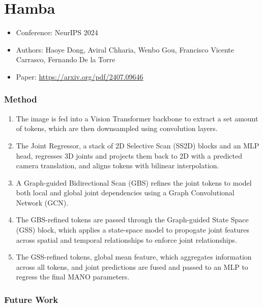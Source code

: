 \documentclass{article}
\begin{document}
\pagebreak

\section*{Hamba}

\begin{itemize}
    \item Conference: NeurIPS 2024
    \item Authors: Haoye Dong, Aviral Chharia, Wenbo Gou, Francisco Vicente Carrasco, Fernando De la Torre
    \item Paper: \url{https://arxiv.org/pdf/2407.09646}
\end{itemize}

\subsubsection*{Method}
\begin{enumerate}
    \item The image is fed into a Vision Transformer backbone to extract a set amount of tokens, which are then downsampled using convolution layers.
    \item The Joint Regressor, a stack of 2D Selective Scan (SS2D) blocks and an MLP head, regresses 3D joints and projects them back to 2D with a predicted camera translation, and aligns tokens with bilinear interpolation.
    \item A Graph-guided Bidirectional Scan (GBS) refines the joint tokens to model both local and global joint dependencies using a Graph Convolutional Network (GCN).
    \item The GBS-refined tokens are passed through the Graph-guided State Space (GSS) block, which applies a state-space model to propogate joint features across spatial and temporal relationships to enforce joint relationships.
    \item The GSS-refined tokens, global mean feature, which aggregates information across all tokens, and joint predictions are fused and passed to an MLP to regress the final MANO parameters.
\end{enumerate}

\subsubsection*{Future Work}
\end{document}
